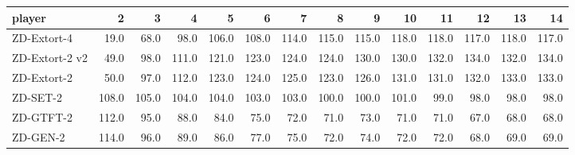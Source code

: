 \begin{tabular}{lrrrrrrrrrrrrr}
\toprule
         player &      2 &      3 &      4 &      5 &      6 &      7 &      8 &      9 &     10 &     11 &     12 &     13 &     14 \\
\midrule
    ZD-Extort-4 &   19.0 &   68.0 &   98.0 &  106.0 &  108.0 &  114.0 &  115.0 &  115.0 &  118.0 &  118.0 &  117.0 &  118.0 &  117.0 \\
 ZD-Extort-2 v2 &   49.0 &   98.0 &  111.0 &  121.0 &  123.0 &  124.0 &  124.0 &  130.0 &  130.0 &  132.0 &  134.0 &  132.0 &  134.0 \\
    ZD-Extort-2 &   50.0 &   97.0 &  112.0 &  123.0 &  124.0 &  125.0 &  123.0 &  126.0 &  131.0 &  131.0 &  132.0 &  133.0 &  133.0 \\
       ZD-SET-2 &  108.0 &  105.0 &  104.0 &  104.0 &  103.0 &  103.0 &  100.0 &  100.0 &  101.0 &   99.0 &   98.0 &   98.0 &   98.0 \\
      ZD-GTFT-2 &  112.0 &   95.0 &   88.0 &   84.0 &   75.0 &   72.0 &   71.0 &   73.0 &   71.0 &   71.0 &   67.0 &   68.0 &   68.0 \\
       ZD-GEN-2 &  114.0 &   96.0 &   89.0 &   86.0 &   77.0 &   75.0 &   72.0 &   74.0 &   72.0 &   72.0 &   68.0 &   69.0 &   69.0 \\
\bottomrule
\end{tabular}
